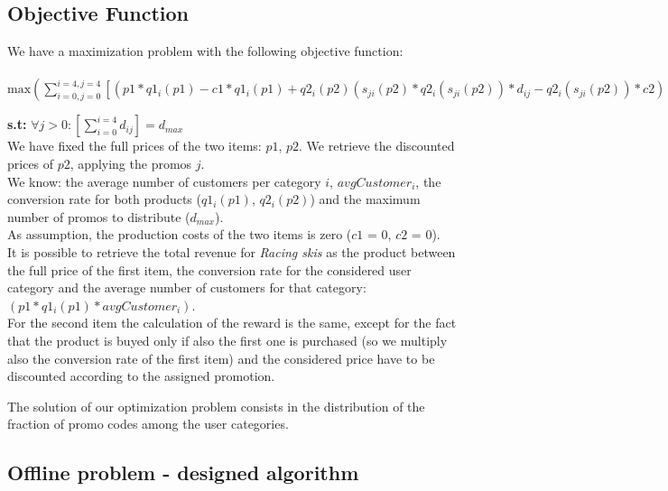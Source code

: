 \subsection*{Objective Function}
We have a maximization problem with the following objective function:\\
\\
$\textrm {max} ( \sum \limits _{i = 0, j = 0} ^{i = 4, j = 4}[(p1*q1_i(p1) - c1*q1_i(p1) + q2_i(p2)(s_{ji}(p2)*q2_i(s_{ji}(p2))*d_{ij} -  q2_i(s_{ji}(p2))*c2))*avgCustomer_i])$

\textbf{s.t:} $ \forall j>0 : [\sum \limits _{i = 0} ^{i = 4} d_{ij}] = d_{max} $
\\
We have fixed the full prices of the two items: $p1$, $p2$. We retrieve the discounted prices of $p2$, applying the promos $j$. \\
We know: the average number of customers per category $i$, $avgCustomer_i$, the conversion rate for both products ($q1_i(p1)$, $q2_i(p2)$) and the maximum number of promos to distribute ($d_{max}$).\\
As assumption, the production costs of the two items is zero ($c1$ = 0, $c2$ = 0).\\
It is possible to retrieve the total revenue for \textit{Racing skis} as the product between the full price of the first item, the conversion rate for the considered user category and the average number of customers for that category:
$(p1 * q1_i(p1) * avgCustomer_i)$.\\
For the second item the calculation of the reward is the same, except for the fact that the product is buyed only if also the first one is purchased (so we multiply also the conversion rate of the first item) and the considered price have to be discounted according to the assigned promotion. 

The solution of our optimization problem consists in the distribution of the fraction of promo codes among the user categories.

\subsection*{Offline problem - designed algorithm}


